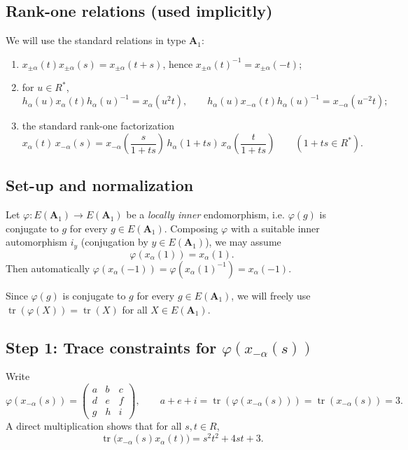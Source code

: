 \documentclass[]{jgcc}
\DeclareMathOperator{\tr}{tr}
\numberwithin{equation}{section}
\begin{document}
\subsection*{Rank-one relations (used implicitly)}
We will use the standard relations in type $\mathbf A_1$:
\begin{enumerate}
\item $x_{\pm\alpha}(t)x_{\pm\alpha}(s)=x_{\pm\alpha}(t+s)$, hence $x_{\pm\alpha}(t)^{-1}=x_{\pm\alpha}(-t)$;
\item for $u\in R^*$,
\[
h_\alpha(u)x_\alpha(t)h_\alpha(u)^{-1}=x_\alpha(u^2t),\qquad
h_\alpha(u)x_{-\alpha}(t)h_\alpha(u)^{-1}=x_{-\alpha}(u^{-2}t);
\]
\item the standard rank-one factorization
\[
x_\alpha(t)\,x_{-\alpha}(s)
= x_{-\alpha}\!\left( \frac{s}{1+ts} \right)\,
h_\alpha(1+ts)\,
x_\alpha\!\left( \frac{t}{1+ts} \right)\qquad (1+ts\in R^*).
\]
\end{enumerate}

\subsection*{Set-up and normalization}
Let $\varphi\colon E(\mathbf A_1)\to E(\mathbf A_1)$ be a \emph{locally inner} endomorphism, i.e. $\varphi(g)$ is conjugate to $g$
for every $g\in E(\mathbf A_1)$.
Composing $\varphi$ with a suitable inner automorphism $i_y$ (conjugation by $y\in E(\mathbf A_1)$),
we may assume
\begin{equation}\label{eq:norm}
\varphi(x_\alpha(1))=x_{\alpha}(1).
\end{equation}
Then automatically $\varphi(x_\alpha(-1))=\varphi(x_\alpha(1)^{-1})=x_\alpha(-1)$.

\begin{rem}\label{rem:trace}
Since $\varphi(g)$ is conjugate to $g$ for every $g\in E(\mathbf A_1)$,
we will freely use $\tr(\varphi(X))=\tr(X)$ for all $X\in E(\mathbf A_1)$.
\end{rem}

\subsection*{\texorpdfstring{Step 1: Trace constraints for $\varphi(x_{-\alpha}(s))$}{Step 1: Trace constraints for phi(x-alpha(s))}}
Write
\[
\varphi(x_{-\alpha}(s))=
\begin{pmatrix}
a& b& c\\
d& e& f\\
g& h& i
\end{pmatrix},
\qquad a+e+i=\tr(\varphi(x_{-\alpha}(s)))=\tr(x_{-\alpha}(s))=3.
\]
A direct multiplication shows that for all $s,t\in R$,
\begin{equation}\label{eq:traceA1}
\tr\bigl(x_{-\alpha}(s)x_\alpha(t)\bigr)=s^2t^2+4st+3.
\end{equation}
\end{document}
